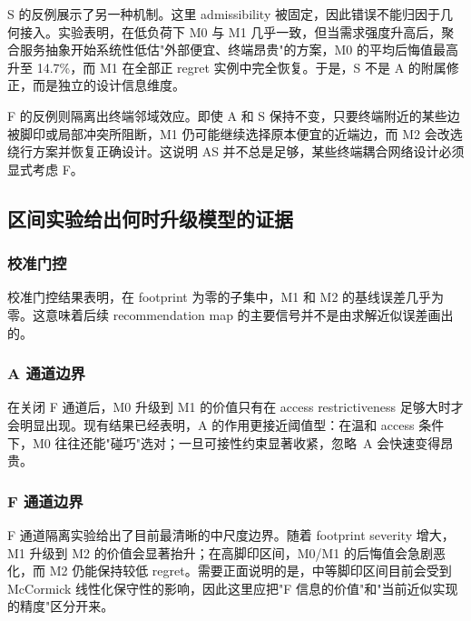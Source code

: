 \documentclass[review,authoryear]{elsarticle}
\begin{document}
S 的反例展示了另一种机制。这里 admissibility 被固定，因此错误不能归因于几何接入。实验表明，在低负荷下 M0 与 M1 几乎一致，但当需求强度升高后，聚合服务抽象开始系统性低估"外部便宜、终端昂贵"的方案，M0 的平均后悔值最高升至 14.7\%，而 M1 在全部正 regret 实例中完全恢复。于是，S 不是 A 的附属修正，而是独立的设计信息维度。

F 的反例则隔离出终端邻域效应。即使 A 和 S 保持不变，只要终端附近的某些边被脚印或局部冲突所阻断，M1 仍可能继续选择原本便宜的近端边，而 M2 会改选绕行方案并恢复正确设计。这说明 AS 并不总是足够，某些终端耦合网络设计必须显式考虑 F。

\begin{table}[htbp]
  \centering
  \caption{A、S、F 三个最小反例的核心结果。}
  \label{tab:counterexamples}
\end{table}

\subsection{区间实验给出何时升级模型的证据}
\label{sec:results:regime}

\subsubsection{校准门控}
\label{sec:results:calibration}

校准门控结果表明，在 footprint 为零的子集中，M1 和 M2 的基线误差几乎为零。这意味着后续 recommendation map 的主要信号并不是由求解近似误差画出的。

\subsubsection{A 通道边界}
\label{sec:results:access}

在关闭 F 通道后，M0 升级到 M1 的价值只有在 access restrictiveness 足够大时才会明显出现。现有结果已经表明，A 的作用更接近阈值型：在温和 access 条件下，M0 往往还能"碰巧"选对；一旦可接性约束显著收紧，忽略~A 会快速变得昂贵。

\subsubsection{F 通道边界}
\label{sec:results:footprint}

F 通道隔离实验给出了目前最清晰的中尺度边界。随着 footprint severity 增大，M1 升级到 M2 的价值会显著抬升；在高脚印区间，M0/M1 的后悔值会急剧恶化，而 M2 仍能保持较低 regret。需要正面说明的是，中等脚印区间目前会受到 McCormick 线性化保守性的影响，因此这里应把"F 信息的价值"和"当前近似实现的精度"区分开来。
\end{document}

